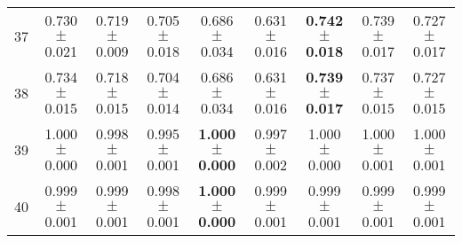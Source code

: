 \begin{table}[!ht]
{\begin{tabular}{r c c c c c c c c}
37 & 0.730 $\pm$ 0.021 & 0.719 $\pm$ 0.009 & 0.705 $\pm$ 0.018 & 0.686 $\pm$ 0.034 & 0.631 $\pm$ 0.016 & \textbf{0.742 $\pm$ 0.018} & 0.739 $\pm$ 0.017 & 0.727 $\pm$ 0.017 \\
38 & 0.734 $\pm$ 0.015 & 0.718 $\pm$ 0.015 & 0.704 $\pm$ 0.014 & 0.686 $\pm$ 0.034 & 0.631 $\pm$ 0.016 & \textbf{0.739 $\pm$ 0.017} & 0.737 $\pm$ 0.015 & 0.727 $\pm$ 0.015 \\
39 & 1.000 $\pm$ 0.000 & 0.998 $\pm$ 0.001 & 0.995 $\pm$ 0.001 & \textbf{1.000 $\pm$ 0.000} & 0.997 $\pm$ 0.002 & 1.000 $\pm$ 0.000 & 1.000 $\pm$ 0.001 & 1.000 $\pm$ 0.001 \\
40 & 0.999 $\pm$ 0.001 & 0.999 $\pm$ 0.001 & 0.998 $\pm$ 0.001 & \textbf{1.000 $\pm$ 0.000} & 0.999 $\pm$ 0.001 & 0.999 $\pm$ 0.001 & 0.999 $\pm$ 0.001 & 0.999 $\pm$ 0.001 \\
\end{tabular}}
\end{table}
